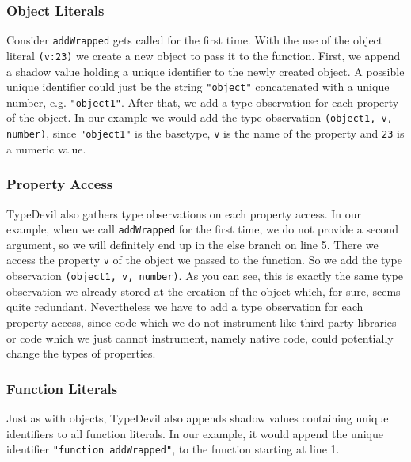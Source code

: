 \documentclass[runningheads,a4paper]{llncs}
\begin{document}
\subsubsection{Object Literals}
Consider \lstinline[columns=fixed]{addWrapped} gets called for the first time.
With the use of the object literal \lstinline[columns=fixed]{(v:23)} we create a new object to pass it to the function.
First, we append a shadow value holding a unique identifier to the newly created object. A possible unique identifier could just be the string \lstinline[columns=fixed]{"object"} concatenated with a unique number, e.g. \lstinline[columns=fixed]{"object1"}.
After that, we add a type observation for each property of the object.
In our example we would add the type observation \lstinline[columns=fixed]{(object1, v, number)}, since \lstinline[columns=fixed]{"object1"} is the basetype, \lstinline[columns=fixed]{v} is the name of the property and \lstinline[columns=fixed]{23} is a numeric value.

\subsubsection{Property Access}
TypeDevil also gathers type observations on each property access.
In our example, when we call \lstinline[columns=fixed]{addWrapped} for the first time, we do not provide a second argument, so we will definitely end up in the else branch on line 5. 
There we access the property \lstinline[columns=fixed]{v} of the object we passed to the function.
So we add the type observation \lstinline[columns=fixed]{(object1, v, number)}.
As you can see, this is exactly the same type observation we already stored at the creation of the object which, for sure, seems quite redundant. 
Nevertheless we have to add a type observation for each property access, since code which we do not instrument like third party libraries or code which we just cannot instrument, namely native code, could potentially change the types of properties.

\subsubsection{Function Literals}
Just as with objects, TypeDevil also appends shadow values containing unique identifiers to all function literals.
In our example, it would append the unique identifier \lstinline[columns=fixed]{"function addWrapped"}, to the function starting at line 1.
\end{document}
